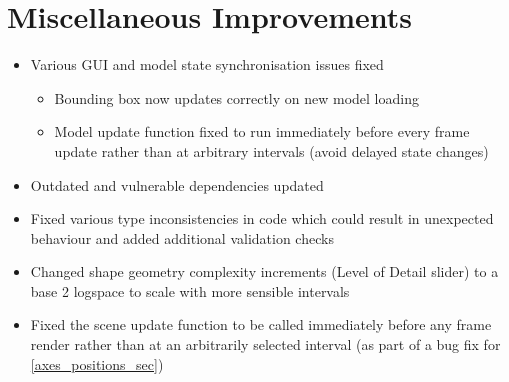 \section{Miscellaneous Improvements}
\begin{itemize}
  \item Various GUI and model state synchronisation issues fixed
  \begin{itemize}
    \item Bounding box now updates correctly on new model loading
    \item Model update function fixed to run immediately before every frame update rather than at arbitrary intervals (avoid delayed state changes)
\end{itemize}
  \item Outdated and vulnerable dependencies updated
  \item Fixed various type inconsistencies in code which could result in unexpected behaviour and added additional validation checks
  \item Changed shape geometry complexity increments (Level of Detail slider) to a base 2 logspace to scale with more sensible intervals
  \item Fixed the scene update function to be called immediately before any frame render rather than at an arbitrarily selected interval (as part of a bug fix for \cref{axes_positions_sec})
\end{itemize}
